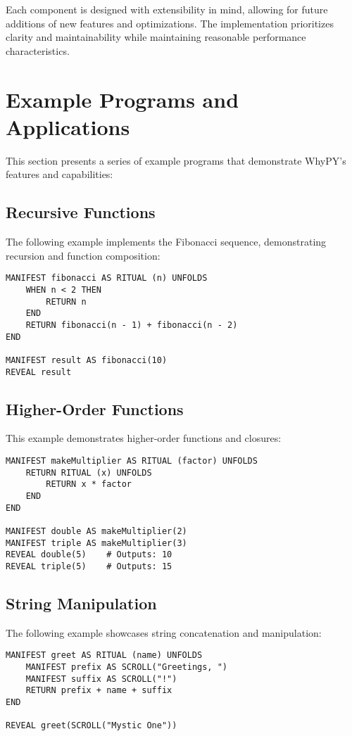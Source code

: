 \documentclass[conference]{IEEEtran}
\begin{document}
Each component is designed with extensibility in mind, allowing for future additions of new features and optimizations. The implementation prioritizes clarity and maintainability while maintaining reasonable performance characteristics.


\section{Example Programs and Applications}

This section presents a series of example programs that demonstrate WhyPY's features and capabilities:

\subsection{Recursive Functions}
The following example implements the Fibonacci sequence, demonstrating recursion and function composition:

\begin{verbatim}
MANIFEST fibonacci AS RITUAL (n) UNFOLDS
    WHEN n < 2 THEN
        RETURN n
    END
    RETURN fibonacci(n - 1) + fibonacci(n - 2)
END

MANIFEST result AS fibonacci(10)
REVEAL result
\end{verbatim}

\subsection{Higher-Order Functions}
This example demonstrates higher-order functions and closures:

\begin{verbatim}
MANIFEST makeMultiplier AS RITUAL (factor) UNFOLDS
    RETURN RITUAL (x) UNFOLDS
        RETURN x * factor
    END
END

MANIFEST double AS makeMultiplier(2)
MANIFEST triple AS makeMultiplier(3)
REVEAL double(5)    # Outputs: 10
REVEAL triple(5)    # Outputs: 15
\end{verbatim}

\subsection{String Manipulation}
The following example showcases string concatenation and manipulation:

\begin{verbatim}
MANIFEST greet AS RITUAL (name) UNFOLDS
    MANIFEST prefix AS SCROLL("Greetings, ")
    MANIFEST suffix AS SCROLL("!")
    RETURN prefix + name + suffix
END

REVEAL greet(SCROLL("Mystic One"))
\end{verbatim}
\end{document}
